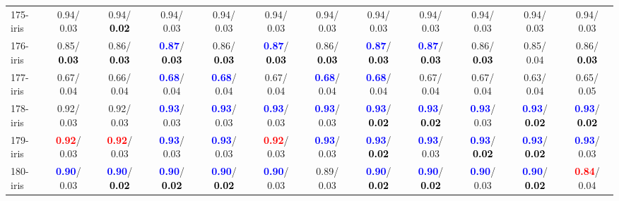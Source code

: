 \begin{table}[h]
\begin{center}
{\begin{tabular}{lc|c|c|c|c|c|c|c|c|c|c}
175-iris &   0.94/  0.03 &   0.94/\textcolor{black}{\textbf{  0.02}} &   0.94/  0.03 &   0.94/  0.03 &   0.94/  0.03 &   0.94/  0.03 &   0.94/  0.03 &   0.94/  0.03 &   0.94/  0.03 &   0.94/  0.03 &   0.94/  0.03 \\
176-iris &   0.85/\textcolor{black}{\textbf{  0.03}} &   0.86/\textcolor{black}{\textbf{  0.03}} & \textcolor{blue}{\textbf{  0.87}}/\textcolor{black}{\textbf{  0.03}} &   0.86/\textcolor{black}{\textbf{  0.03}} & \textcolor{blue}{\textbf{  0.87}}/\textcolor{black}{\textbf{  0.03}} &   0.86/\textcolor{black}{\textbf{  0.03}} & \textcolor{blue}{\textbf{  0.87}}/\textcolor{black}{\textbf{  0.03}} & \textcolor{blue}{\textbf{  0.87}}/\textcolor{black}{\textbf{  0.03}} &   0.86/\textcolor{black}{\textbf{  0.03}} &   0.85/  0.04 &   0.86/\textcolor{black}{\textbf{  0.03}} \\
177-iris &   0.67/  0.04 &   0.66/  0.04 & \textcolor{blue}{\textbf{  0.68}}/  0.04 & \textcolor{blue}{\textbf{  0.68}}/  0.04 &   0.67/  0.04 & \textcolor{blue}{\textbf{  0.68}}/  0.04 & \textcolor{blue}{\textbf{  0.68}}/  0.04 &   0.67/  0.04 &   0.67/  0.04 &   0.63/  0.04 &   0.65/  0.05 \\
178-iris &   0.92/  0.03 &   0.92/  0.03 & \textcolor{blue}{\textbf{  0.93}}/  0.03 & \textcolor{blue}{\textbf{  0.93}}/  0.03 & \textcolor{blue}{\textbf{  0.93}}/  0.03 & \textcolor{blue}{\textbf{  0.93}}/  0.03 & \textcolor{blue}{\textbf{  0.93}}/\textcolor{black}{\textbf{  0.02}} & \textcolor{blue}{\textbf{  0.93}}/\textcolor{black}{\textbf{  0.02}} & \textcolor{blue}{\textbf{  0.93}}/  0.03 & \textcolor{blue}{\textbf{  0.93}}/\textcolor{black}{\textbf{  0.02}} & \textcolor{blue}{\textbf{  0.93}}/\textcolor{black}{\textbf{  0.02}} \\
179-iris & \textcolor{red}{\textbf{  0.92}}/  0.03 & \textcolor{red}{\textbf{  0.92}}/  0.03 & \textcolor{blue}{\textbf{  0.93}}/  0.03 & \textcolor{blue}{\textbf{  0.93}}/  0.03 & \textcolor{red}{\textbf{  0.92}}/  0.03 & \textcolor{blue}{\textbf{  0.93}}/  0.03 & \textcolor{blue}{\textbf{  0.93}}/\textcolor{black}{\textbf{  0.02}} & \textcolor{blue}{\textbf{  0.93}}/  0.03 & \textcolor{blue}{\textbf{  0.93}}/\textcolor{black}{\textbf{  0.02}} & \textcolor{blue}{\textbf{  0.93}}/\textcolor{black}{\textbf{  0.02}} & \textcolor{blue}{\textbf{  0.93}}/  0.03 \\
180-iris & \textcolor{blue}{\textbf{  0.90}}/  0.03 & \textcolor{blue}{\textbf{  0.90}}/\textcolor{black}{\textbf{  0.02}} & \textcolor{blue}{\textbf{  0.90}}/\textcolor{black}{\textbf{  0.02}} & \textcolor{blue}{\textbf{  0.90}}/\textcolor{black}{\textbf{  0.02}} & \textcolor{blue}{\textbf{  0.90}}/  0.03 &   0.89/  0.03 & \textcolor{blue}{\textbf{  0.90}}/\textcolor{black}{\textbf{  0.02}} & \textcolor{blue}{\textbf{  0.90}}/\textcolor{black}{\textbf{  0.02}} & \textcolor{blue}{\textbf{  0.90}}/  0.03 & \textcolor{blue}{\textbf{  0.90}}/\textcolor{black}{\textbf{  0.02}} & \textcolor{red}{\textbf{  0.84}}/  0.04 \\

\end{tabular}}
\end{center}
\end{table}
